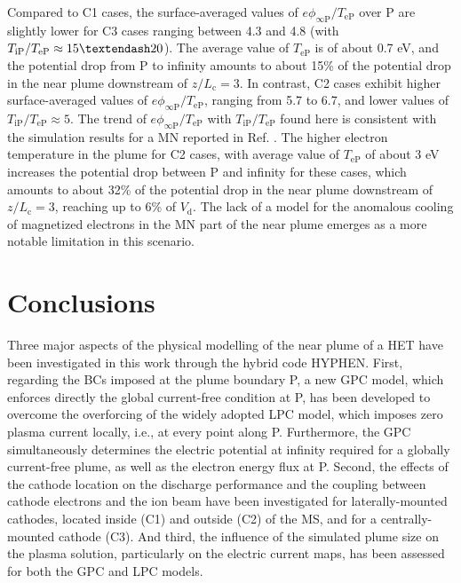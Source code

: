 \documentclass[%
 aip,
cha,
 amsmath,amssymb,
 reprint,%
]{revtex4-1}
\begin{document}
Compared to C1 cases, the surface-averaged values of $e\phi_\mathrm{\infty P}/T_\mathrm{eP}$ over P are slightly lower for C3 cases ranging between 4.3 and 4.8 (with $T_\mathrm{iP}/T_\mathrm{eP} \approx 15\textendash 20$). The average value of $T_\mathrm{eP}$ is of about 0.7 eV, and the potential drop from P to infinity amounts to about 15\% of the potential drop in the near plume downstream of $z/L_\mathrm{c} = 3$.
%
In contrast, C2 cases exhibit higher surface-averaged values of $e\phi_\mathrm{\infty P}/T_\mathrm{eP}$, ranging from 5.7 to 6.7, and lower values of $T_\mathrm{iP}/T_\mathrm{eP} \approx 5$. The trend of $e\phi_\mathrm{\infty P}/T_\mathrm{eP}$ with $T_\mathrm{iP}/T_\mathrm{eP}$ found here is consistent with the simulation results for a MN reported in Ref. . The higher electron temperature in the plume for C2 cases, with average value of $T_\mathrm{eP}$ of about 3 eV increases the potential drop between P and infinity for these cases, which amounts to about 32\% of the potential drop in the near plume downstream  of $z/L_\mathrm{c} = 3$, reaching up to 6\% of $V_\mathrm{d}$. The lack of a model for the anomalous cooling of magnetized electrons in the MN part of the near plume emerges as a more notable limitation in this scenario.



\section{Conclusions}\label{sec: conclusions}

Three major aspects of the physical modelling of the near plume of a HET have been investigated in this work through the hybrid code HYPHEN. 
First, regarding the BCs imposed at the plume boundary P, a new GPC model, which enforces directly the global current-free condition at P, has been developed to overcome the overforcing of the widely adopted LPC model, which imposes zero plasma current locally, i.e., at every point along P. Furthermore, the GPC simultaneously determines the electric potential at infinity required for a globally current-free plume, as well as the electron energy flux at P.
%
Second, the effects of the cathode location on the discharge performance and the coupling between cathode electrons and the ion beam have been investigated for laterally-mounted cathodes, located inside (C1) and outside (C2) of the MS, and for a centrally-mounted cathode (C3).
%
And third, the influence of the simulated plume size on the plasma solution, particularly on the electric current maps, has been assessed for both the GPC and LPC models.
%
\end{document}
